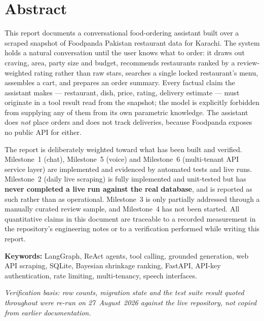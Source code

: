 \documentclass[11pt,a4paper]{article}
\begin{document}
\section*{Abstract}

This report documents a conversational food-ordering assistant built over a
scraped snapshot of Foodpanda Pakistan restaurant data for Karachi. The system
holds a natural conversation until the user knows what to order: it draws out
craving, area, party size and budget, recommends restaurants ranked by a
review-weighted rating rather than raw stars, searches a single locked
restaurant's menu, assembles a cart, and prepares an order summary. Every
factual claim the assistant makes --- restaurant, dish, price, rating,
delivery estimate --- must originate in a tool result read from the snapshot;
the model is explicitly forbidden from supplying any of them from its own
parametric knowledge. The assistant does \emph{not} place orders and does not
track deliveries, because Foodpanda exposes no public API for either.

The report is deliberately weighted toward what has been built and verified.
Milestone~1 (chat), Milestone~5 (voice) and Milestone~6 (multi-tenant API
service layer) are implemented and evidenced by automated tests and live
runs. Milestone~2 (daily live scraping) is fully implemented and unit-tested
but has \textbf{never completed a live run against the real database}, and is
reported as such rather than as operational. Milestone~3 is only partially
addressed through a manually curated review sample, and Milestone~4 has not
been started. All quantitative claims in this document are traceable to a
recorded measurement in the repository's engineering notes or to a
verification performed while writing this report.

\vspace{0.35cm}
\noindent\textbf{Keywords:} LangGraph, ReAct agents, tool calling, grounded
generation, web API scraping, SQLite, Bayesian shrinkage ranking, FastAPI,
API-key authentication, rate limiting, multi-tenancy, speech interfaces.

\vspace{0.6cm}
{\small\itshape Verification basis: row counts, migration state and the test
suite result quoted throughout were re-run on 27~August~2026 against the live
repository, not copied from earlier documentation.}

\clearpage
\tableofcontents
\clearpage
\end{document}
